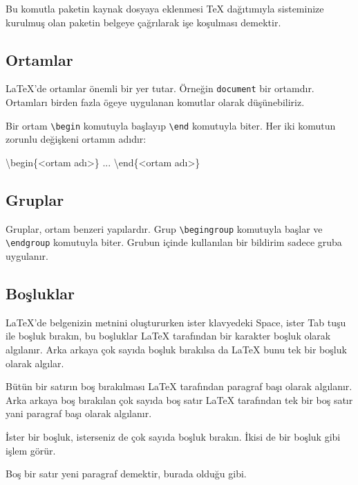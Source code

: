 \documentclass[
  10pt,
]{scrbook}
\newenvironment{Shaded}{\begin{snugshade}}{\end{snugshade}}
\newcommand{\NormalTok}[1]{#1}
\begin{document}
Bu komutla paketin kaynak dosyaya eklenmesi TeX dağıtımıyla sisteminize
kurulmuş olan paketin belgeye çağrılarak işe koşulması demektir.

\hypertarget{ortamlar}{%
\subsection{Ortamlar}\label{ortamlar}}

LaTeX'de ortamlar önemli bir yer tutar. Örneğin \texttt{document} bir ortamdır.
Ortamları birden fazla ögeye uygulanan komutlar olarak düşünebiliriz.

Bir ortam \texttt{\textbackslash{}begin} komutuyla başlayıp \texttt{\textbackslash{}end} komutuyla biter. Her iki
komutun zorunlu değişkeni ortamın adıdır:

\begin{Shaded}
\begin{Highlighting}[]
\NormalTok{\textbackslash{}begin\{\textless{}ortam adı\textgreater{}\}}
\NormalTok{ ...}
\NormalTok{\textbackslash{}end\{\textless{}ortam adı\textgreater{}\}}
\end{Highlighting}
\end{Shaded}

\hypertarget{gruplar}{%
\subsection{Gruplar}\label{gruplar}}

Gruplar, ortam benzeri yapılardır. Grup \texttt{\textbackslash{}begingroup} komutuyla başlar
ve \texttt{\textbackslash{}endgroup} komutuyla biter. Grubun içinde kullanılan bir bildirim
sadece gruba uygulanır.

\hypertarget{boux15fluklar}{%
\subsection{Boşluklar}\label{boux15fluklar}}

LaTeX'de belgenizin metnini oluştururken ister klavyedeki Space, ister
Tab tuşu ile boşluk bırakın, bu boşluklar LaTeX tarafından bir karakter
boşluk olarak algılanır. Arka arkaya çok sayıda boşluk bırakılsa da
LaTeX bunu tek bir boşluk olarak algılar.

Bütün bir satırın boş bırakılması LaTeX tarafından paragraf başı olarak
algılanır. Arka arkaya boş bırakılan çok sayıda boş satır LaTeX
tarafından tek bir boş satır yani paragraf başı olarak algılanır.

\begin{Shaded}
\begin{Highlighting}[]
\NormalTok{ İster bir boşluk, isterseniz de çok         sayıda boşluk bırakın. }
\NormalTok{İkisi de bir boşluk gibi işlem görür. }

\NormalTok{Boş bir satır yeni paragraf demektir, burada olduğu gibi.}
\end{Highlighting}
\end{Shaded}
\end{document}
